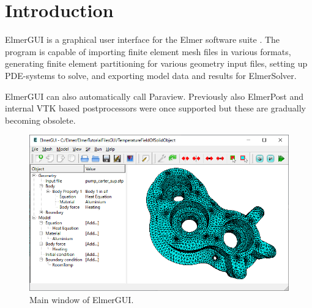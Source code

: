 

\chapter{Introduction}

ElmerGUI is a graphical user interface for the Elmer software suite
\cite{ElmerHome}. The program is capable of importing finite element mesh files in
various formats, generating finite element partitioning for various geometry
input files, setting up PDE-systems to solve, and exporting model data and results
for ElmerSolver.

ElmerGUI can also automatically call Paraview. Previously also ElmerPost and internal
VTK based postprocessors were once supported but these are gradually becoming obsolete.

\begin{figure}[htb]
\begin{center}
 \includegraphics[scale=0.6]{images/elmergui.png}
\caption{Main window of ElmerGUI.}
\end{center}
\end{figure}

